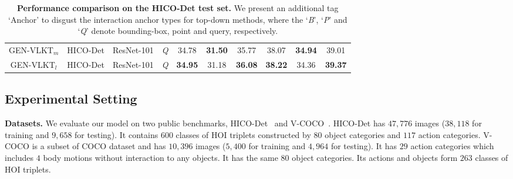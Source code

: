 \documentclass[10pt,twocolumn,letterpaper]{article}
\begin{document}
\begin{table*}[!t]
\begin{center}
{\begin{tabular}{cccc|ccc|ccc}
  \cellcolor{mygray-bg}GEN-VLKT$_m$		& \cellcolor{mygray-bg}HICO-Det		&\cellcolor{mygray-bg}ResNet-101	&\cellcolor{mygray-bg}\emph{Q}				&\cellcolor{mygray-bg}34.78	&\cellcolor{mygray-bg}\textbf{31.50}	&\cellcolor{mygray-bg}35.77      &\cellcolor{mygray-bg}38.07	&\cellcolor{mygray-bg}\textbf{34.94}	&\cellcolor{mygray-bg}39.01\\
    \cellcolor{mygray-bg}GEN-VLKT$_l$		&	\cellcolor{mygray-bg}HICO-Det	&\cellcolor{mygray-bg}ResNet-101	&\cellcolor{mygray-bg}\emph{Q}				&\cellcolor{mygray-bg}\textbf{34.95}	&\cellcolor{mygray-bg}31.18	&\cellcolor{mygray-bg}\textbf{36.08}       &\cellcolor{mygray-bg}\textbf{38.22}	&\cellcolor{mygray-bg}34.36	&\cellcolor{mygray-bg}\textbf{39.37}\\
  \hline           
  \end{tabular}}
  \end{center}
  \vspace{-3mm}
  \caption{\textbf{Performance comparison on the HICO-Det test set.} We present an additional tag `Anchor' to disgust the interaction anchor types for top-down methods, where the `\emph{B}', `\emph{P}' and `\emph{Q}' denote bounding-box, point and query, respectively.}
  \label{tb:hico}
  \vspace{-3mm}
  \end{table*}
  
\vspace{-1mm}\subsection{Experimental Setting}\label{sec:setting}\vspace{-1mm}
\noindent\textbf{Datasets.} We evaluate our model on two public benchmarks, HICO-Det~\cite{chao2018learning} and V-COCO~\cite{gupta2015visual}. HICO-Det has $47,776$ images ($38,118$ for training and $9,658$ for testing). It contains $600$ classes of HOI triplets constructed by $80$ object categories and $117$ action categories. V-COCO is a subset of COCO dataset and has $10,396$ images ($5,400$ for training and $4,964$ for testing). It has $29$ action categories which includes $4$ body motions without interaction to any objects. It has the same $80$ object categories. Its actions and objects form $263$ classes of HOI triplets.
\end{document}
